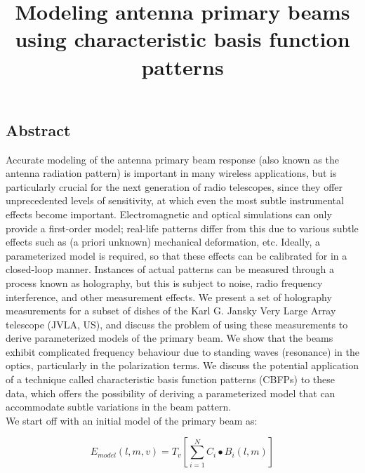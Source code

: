 \documentclass[12pt, a4paper]{article}%
\title{ \bfseries  \LARGE Modeling antenna primary beams using characteristic basis function patterns}
\theoremstyle{plain}
\begin{document}
\maketitle



\subsection{Abstract}

Accurate modeling of the antenna primary beam response (also known as the antenna radiation pattern) is important in many wireless applications, but is particularly crucial for the next generation of radio telescopes, since they offer unprecedented levels of sensitivity, at which even the most subtle instrumental effects become important. Electromagnetic and optical simulations can only provide a first-order model; real-life patterns differ from this due to various subtle effects such as (a priori unknown) mechanical deformation, etc. Ideally, a parameterized model is required, so that these effects can be calibrated for in a closed-loop manner. Instances of actual patterns can be measured through a process known as holography, but this is subject to noise, radio frequency interference, and other measurement effects. We present a set of holography measurements for a subset of dishes of the Karl G. Jansky Very Large Array telescope (JVLA, US), and discuss the problem of using these measurements to derive parameterized models of the primary beam. We show that the beams exhibit complicated frequency behaviour due to standing waves (resonance) in the optics, particularly in the polarization terms. We discuss the potential application of a technique called characteristic basis function patterns (CBFPs) to these data, which offers the possibility of deriving a parameterized model that can accommodate subtle variations in the beam pattern.\\

\noindent We start off with an initial model of the primary beam as:

\begin{equation}
E_{model}(l, m, v) = T_v \left[ \sum_{i=1}^{N}C_i \bullet B_i(l, m)\right]
\end{equation}
\end{document}
